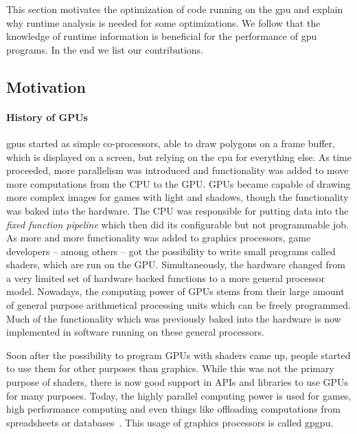 {}
This section motivates the optimization of code running on the \gls{gpu} and explain why runtime analysis is needed for some optimizations. We follow that the knowledge of runtime information is beneficial for the performance of \gls{gpu} programs. In the end we list our contributions.

\subsection{Motivation}
\label{sub:motivation}
\paragraph{History of GPUs} \Glspl{gpu} started as simple co-processors, able to draw polygons on a frame buffer, which is displayed on a screen, but relying on the \gls{cpu} for everything else. As time proceeded, more parallelism was introduced and functionality was added to move more computations from the CPU to the GPU. GPUs became capable of drawing more complex images for games with light and shadows, though the functionality was baked into the hardware. The CPU was responsible for putting data into the \emph{fixed function pipeline} which then did its configurable but not programmable job.
As more and more functionality was added to graphics processors, game developers -- among others -- got the possibility to write small programs called shaders, which are run on the GPU. Simultaneously, the hardware changed from a very limited set of hardware backed functions to a more general processor model. Nowadays, the computing power of GPUs stems from their large amount of general purpose arithmetical processing units which can be freely programmed. Much of the functionality which was previously baked into the hardware is now implemented in software running on these general processors.~\cite{McClanahan2010}

Soon after the possibility to program GPUs with shaders came up, people started to use them for other purposes than graphics. While this was not the primary purpose of shaders, there is now good support in APIs and libraries to use GPUs for many purposes. Today, the highly parallel computing power is used for games, high performance computing and even things like offloading computations from spreadsheets or databases~\cite{Lillqvist2016, Meraji2015}. This usage of graphics processors is called \gls{gpgpu}.

